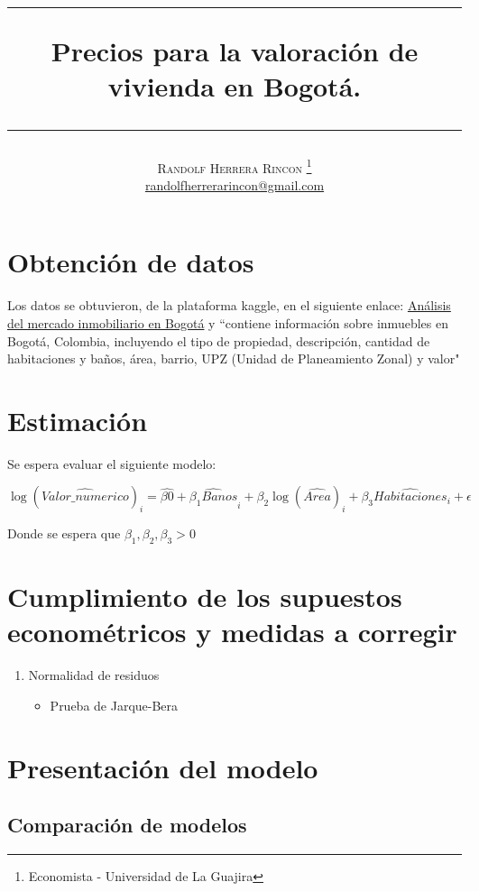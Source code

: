 \documentclass[12pt,a4paper]{article}
\title{   \begin{center}\rule{0.9\textwidth}{0.1mm} \end{center}
    {\Huge\textbf{Precios para la valoración de vivienda en Bogotá.}}
    \begin{center}\rule{0.9\textwidth}{0.1mm} \end{center}
}
\author{\textsc{Randolf Herrera Rincon}
    \thanks{Economista - Universidad de La Guajira}\\
    \normalsize 
    \href{mailto:randolfherrerarincon@gmail.com}{randolfherrerarincon@gmail.com}   
}
\begin{document}
\maketitle
\tableofcontents
\newpage

\section{Obtención de datos}
Los datos se obtuvieron, de la plataforma kaggle, en el siguiente enlace: \href{https://www.kaggle.com/datasets/pablobravo73/real-estate-bogota}{Análisis del mercado inmobiliario en Bogotá} y ``contiene información sobre inmuebles en Bogotá, Colombia, incluyendo el tipo de propiedad, descripción, cantidad de habitaciones y baños, área, barrio, UPZ (Unidad de Planeamiento Zonal) y valor" \citep{Camacho2024}
\section{Estimación}
Se espera evaluar el siguiente modelo:

\begin{equation}
	\log(\widehat{Valor\_numerico})_{i}=\widehat{\beta{0}} + \widehat{\beta_{1}Banos}_{i} + \beta_{2}\log(\widehat{Area})_{i} + \beta_{3}\widehat{Habitaciones}_{i} + \epsilon
\end{equation}

Donde se espera que $\beta_{1}, \beta_{2}, \beta_{3} > 0$

\section{Cumplimiento de los supuestos econométricos y medidas a corregir}

\begin{enumerate}
	\item Normalidad de residuos
	\begin{itemize}
		\item Prueba de Jarque-Bera
	\end{itemize}
\end{enumerate}



\section{Presentación del modelo}
\subsection{Comparación de modelos}
\end{document}
